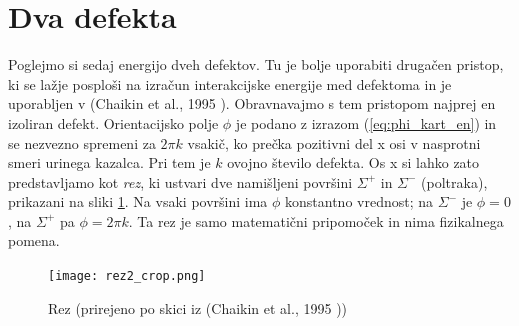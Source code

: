 \documentclass[11pt]{article}
\begin{document}




\section{Dva defekta}
\label{sec:dva}
Poglejmo si sedaj energijo dveh defektov. Tu je bolje uporabiti drugačen pristop, ki se lažje posploši na izračun interakcijske energije med defektoma in je uporabljen v (Chaikin et al., 1995 \cite{chaikin1995principles}).
Obravnavajmo s tem pristopom najprej en izoliran defekt. Orientacijsko polje $\phi$ je podano z izrazom (\ref{eq:phi_kart_en}) in se nezvezno spremeni za $2\pi k$ vsakič, ko prečka pozitivni del x osi v nasprotni smeri urinega kazalca. Pri tem je $k$ ovojno število defekta. Os x si lahko zato predstavljamo kot \emph{rez}, ki ustvari dve namišljeni površini $\Sigma^{+}$ in $\Sigma^{-}$ (poltraka), prikazani na sliki \ref{fig:rez}. Na vsaki površini ima $\phi$ konstantno vrednost; na $\Sigma^{-}$ je $\phi = 0$, na $\Sigma^{+}$ pa $\phi = 2\pi k$. Ta rez je samo matematični pripomoček in nima fizikalnega pomena.

\begin{figure}[H]
    \centering
    \texttt{[image: rez2\_crop.png]}
    \caption{Rez (prirejeno po skici iz (Chaikin et al., 1995 \cite{chaikin1995principles}))}
    \label{fig:rez}
\end{figure}

\end{document}
